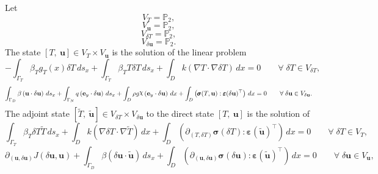 \documentclass[preview]{standalone}
\let\oldcdot\cdot
\let\cdot\oldcdot
\begin{document}
Let
\begin{equation*}
V_{T} = \mathbb P_{2},\end{equation*}
\begin{equation*}
V_{{\mathbf{ u }}} = \mathbb P_{2},\end{equation*}
\begin{equation*}
V_{\delta T} = \mathbb P_{2},\end{equation*}
\begin{equation*}
V_{{\delta\mathbf{  u }}} = \mathbb P_{2}.\end{equation*}
The state $\left[ T, \  {\mathbf{ u }}\right] \in  V_{T}\times V_{{\mathbf{ u }}}$ is the solution of the linear problem
\begin{dmath*}
-  \int_{\Gamma_{T}} \beta_{T} g_{T}(x) \delta T \,ds_x +  \int_{\Gamma_{T}} \beta_{T} T \delta T \,ds_x +  \int_{D} k \left(  \nabla T  \cdot  \nabla \delta T  \right) \,dx = 0\qquad \forall\; {\delta T\in V_{\delta T}} , 
\end{dmath*}
\begin{dmath*}
 \int_{\Gamma_D} \beta \left( {\mathbf{ u }} \cdot {\delta\mathbf{  u }} \right) \,ds_x +  \int_{\Gamma_N} q \left( \mathbf e_y \cdot {\delta\mathbf{  u }} \right) \,ds_x +  \int_{D} \rho g \raisebox{\depth}{$\chi$} \left( \mathbf e_y \cdot {\delta\mathbf{  u }} \right) \,dx +  \int_{D} \left( \pmb \sigma(T,{\mathbf{ u }}) \mathrel{:}  \pmb\varepsilon({\delta\mathbf{  u }})^\top  \right) \,dx = 0\qquad \forall\; {{\delta\mathbf{  u }}\in V_{{\delta\mathbf{  u }}}} . 
\end{dmath*}
The adjoint state $\left[ \tilde T, \  \tilde{\mathbf{ u }}\right] \in  V_{\delta T}\times V_{{\delta\mathbf{  u }}}$ to the direct state $\left[ T, \  {\mathbf{ u }}\right]$ is the solution of
\begin{dmath*}
 \int_{\Gamma_{T}} \beta_{T} \delta T \tilde T \,ds_x +  \int_{D} k \left(  \nabla \delta T  \cdot  \nabla \tilde T  \right) \,dx +  \int_{D} \left( \partial_{(T,\delta T)} \pmb \sigma(\delta T) \mathrel{:}  \pmb\varepsilon(\tilde{\mathbf{ u }})^\top  \right) \,dx = 0\qquad \forall\; {\delta T\in V_{T}} , 
\end{dmath*}
\begin{dmath*}
\partial_{({\mathbf{ u }},{\delta\mathbf{  u }})} J({\delta\mathbf{  u }},{\mathbf{ u }}) +  \int_{\Gamma_D} \beta \left( {\delta\mathbf{  u }} \cdot \tilde{\mathbf{ u }} \right) \,ds_x +  \int_{D} \left( \partial_{({\mathbf{ u }},{\delta\mathbf{  u }})} \pmb \sigma({\delta\mathbf{  u }}) \mathrel{:}  \pmb\varepsilon(\tilde{\mathbf{ u }})^\top  \right) \,dx = 0\qquad \forall\; {{\delta\mathbf{  u }}\in V_{{\mathbf{ u }}}} , 
\end{dmath*}
\end{document}
